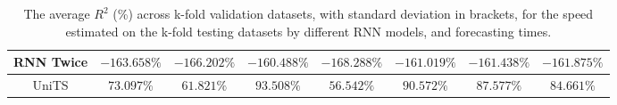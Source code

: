 \begin{table}[!ht]
{\begin{tabular}{|c|c|c|c|c|c|c|c|}
			RNN Twice & $-163.658\%$ & $-166.202\%$ & $-160.488\%$ & $-168.288\%$ & $-161.019\%$ & $-161.438\%$ & $-161.875\%$ \\ \hline
			UniTS & $\mathbf{73.097\%}$ & $\mathbf{61.821\%}$ & $93.508\%$ & $\mathbf{56.542\%}$ & $\mathbf{90.572\%}$ & $\mathbf{87.577\%}$ & $\mathbf{84.661\%}$ \\ \hline
		\end{tabular}
	}
	\caption{The average $R^{2}$ (\%) across k-fold validation datasets, with standard deviation in brackets, for the speed estimated on the k-fold testing datasets by different RNN models, and forecasting times.}
	\label{tab:all_speed_R2}
\end{table}